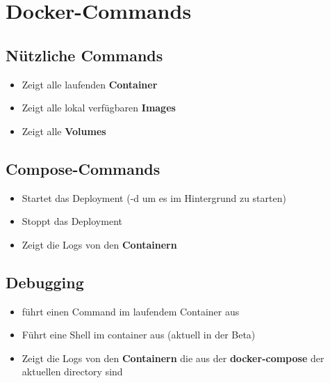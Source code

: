 \section{Docker-Commands}\label{sec:docker-commands}
\subsection{Nützliche Commands}

\begin{frame}
    \slidehead
    \vspace{-1em}
    \vspace{-2pt}
    \begin{itemize}[<+->]
        \item {} Zeigt alle laufenden \textbf{Container}
        \item {} Zeigt alle lokal verfügbaren \textbf{Images}
        \item {} Zeigt alle \textbf{Volumes}
    \end{itemize}
\end{frame}

\subsection{Compose-Commands}
\begin{frame}
    \slidehead
    \vspace{-1em}
    \vspace{-2pt}
    \begin{itemize}[<+->]
        \item {} Startet das Deployment (-d um es im Hintergrund zu starten)
        \item {} Stoppt das Deployment
        \item {} Zeigt die Logs von den \textbf{Containern}
    \end{itemize}
\end{frame}


\subsection{Debugging}
\begin{frame}
    \slidehead
    \vspace{-1em}
    \vspace{-3pt}
    \begin{itemize}[<+->]
        \item {} führt einen Command im laufendem Container aus
        \item {} Führt eine Shell im container aus (aktuell in der Beta)
        \item {} Zeigt die Logs von den \textbf{Containern} die aus der \textbf{docker-compose} der aktuellen directory sind
    \end{itemize}
\end{frame}
